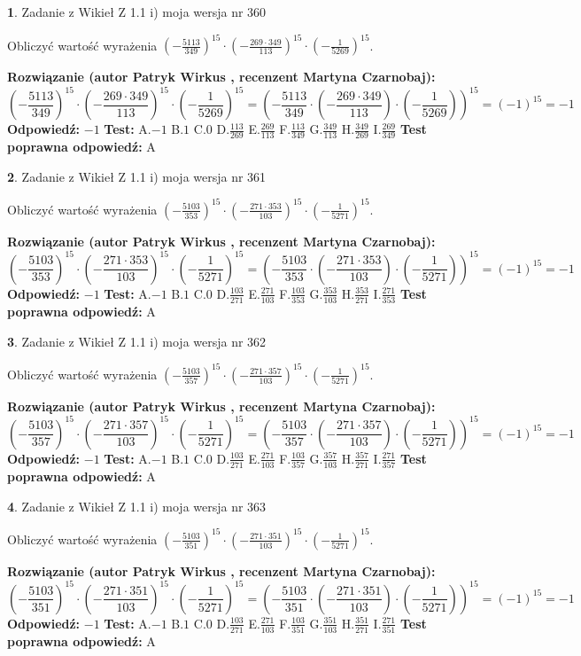 \documentclass[12pt, a4paper]{article}
\theoremstyle{definition} %
\newtheorem{zad}{}
\newcommand{\zadStart}[1]{\begin{zad}#1\newline}
\newcommand{\zadStop}{\end{zad}}
\newcommand{\rozwStart}[2]{\noindent \textbf{Rozwiązanie (autor #1 , recenzent #2): }\newline}
\newcommand{\rozwStop}{\newline}
\newcommand{\odpStart}{\noindent \textbf{Odpowiedź:}\newline}
\newcommand{\odpStop}{\newline}
\newcommand{\testStart}{\noindent \textbf{Test:}\newline}
\newcommand{\testStop}{\newline}
\newcommand{\kluczStart}{\noindent \textbf{Test poprawna odpowiedź:}\newline}
\newcommand{\kluczStop}{\newline}
\begin{document}
\zadStart{Zadanie z Wikieł Z 1.1 i) moja wersja nr 360}

Obliczyć wartość wyrażenia $(-\frac{5113}{349})^{15} \cdot (-\frac{269 \cdot 349}{113})^{15} \cdot (-\frac{1}{5269})^{15}$.
\zadStop
\rozwStart{Patryk Wirkus}{Martyna Czarnobaj}
$$(-\frac{5113}{349})^{15} \cdot (-\frac{269 \cdot 349}{113})^{15} \cdot (-\frac{1}{5269})^{15} = (-\frac{5113}{349} \cdot (-\frac{269 \cdot 349}{113}) \cdot (-\frac{1}{5269}))^{15} = (-1)^{15} = -1$$
\rozwStop
\odpStart
$-1$
\odpStop
\testStart
A.$-1$ B.$1$ C.$0$ D.$\frac{113}{269}$ E.$\frac{269}{113}$
F.$\frac{113}{349}$ G.$\frac{349}{113}$
H.$\frac{349}{269}$
I.$\frac{269}{349}$
\testStop
\kluczStart
A
\kluczStop



\zadStart{Zadanie z Wikieł Z 1.1 i) moja wersja nr 361}

Obliczyć wartość wyrażenia $(-\frac{5103}{353})^{15} \cdot (-\frac{271 \cdot 353}{103})^{15} \cdot (-\frac{1}{5271})^{15}$.
\zadStop
\rozwStart{Patryk Wirkus}{Martyna Czarnobaj}
$$(-\frac{5103}{353})^{15} \cdot (-\frac{271 \cdot 353}{103})^{15} \cdot (-\frac{1}{5271})^{15} = (-\frac{5103}{353} \cdot (-\frac{271 \cdot 353}{103}) \cdot (-\frac{1}{5271}))^{15} = (-1)^{15} = -1$$
\rozwStop
\odpStart
$-1$
\odpStop
\testStart
A.$-1$ B.$1$ C.$0$ D.$\frac{103}{271}$ E.$\frac{271}{103}$
F.$\frac{103}{353}$ G.$\frac{353}{103}$
H.$\frac{353}{271}$
I.$\frac{271}{353}$
\testStop
\kluczStart
A
\kluczStop



\zadStart{Zadanie z Wikieł Z 1.1 i) moja wersja nr 362}

Obliczyć wartość wyrażenia $(-\frac{5103}{357})^{15} \cdot (-\frac{271 \cdot 357}{103})^{15} \cdot (-\frac{1}{5271})^{15}$.
\zadStop
\rozwStart{Patryk Wirkus}{Martyna Czarnobaj}
$$(-\frac{5103}{357})^{15} \cdot (-\frac{271 \cdot 357}{103})^{15} \cdot (-\frac{1}{5271})^{15} = (-\frac{5103}{357} \cdot (-\frac{271 \cdot 357}{103}) \cdot (-\frac{1}{5271}))^{15} = (-1)^{15} = -1$$
\rozwStop
\odpStart
$-1$
\odpStop
\testStart
A.$-1$ B.$1$ C.$0$ D.$\frac{103}{271}$ E.$\frac{271}{103}$
F.$\frac{103}{357}$ G.$\frac{357}{103}$
H.$\frac{357}{271}$
I.$\frac{271}{357}$
\testStop
\kluczStart
A
\kluczStop



\zadStart{Zadanie z Wikieł Z 1.1 i) moja wersja nr 363}

Obliczyć wartość wyrażenia $(-\frac{5103}{351})^{15} \cdot (-\frac{271 \cdot 351}{103})^{15} \cdot (-\frac{1}{5271})^{15}$.
\zadStop
\rozwStart{Patryk Wirkus}{Martyna Czarnobaj}
$$(-\frac{5103}{351})^{15} \cdot (-\frac{271 \cdot 351}{103})^{15} \cdot (-\frac{1}{5271})^{15} = (-\frac{5103}{351} \cdot (-\frac{271 \cdot 351}{103}) \cdot (-\frac{1}{5271}))^{15} = (-1)^{15} = -1$$
\rozwStop
\odpStart
$-1$
\odpStop
\testStart
A.$-1$ B.$1$ C.$0$ D.$\frac{103}{271}$ E.$\frac{271}{103}$
F.$\frac{103}{351}$ G.$\frac{351}{103}$
H.$\frac{351}{271}$
I.$\frac{271}{351}$
\testStop
\kluczStart
A
\kluczStop
\end{document}
